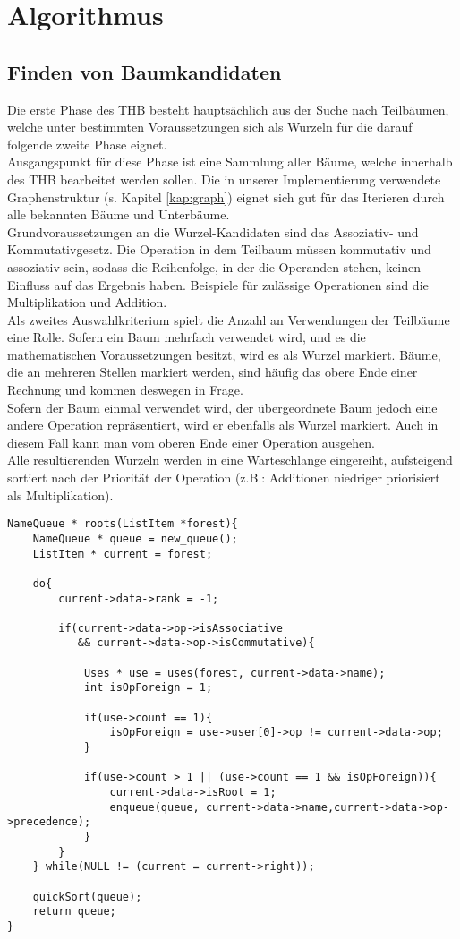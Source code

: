 \chapter{Algorithmus}



\section{Finden von Baumkandidaten}
Die erste Phase des THB besteht hauptsächlich aus der Suche nach Teilbäumen, welche unter bestimmten Voraussetzungen sich als Wurzeln für die darauf folgende zweite Phase eignet.\\
Ausgangspunkt für diese Phase ist eine Sammlung aller Bäume, welche innerhalb des THB bearbeitet werden sollen. Die in unserer Implementierung verwendete Graphenstruktur (s. Kapitel \ref{kap:graph}) eignet sich gut für das Iterieren durch alle bekannten Bäume und Unterbäume.\\
Grundvoraussetzungen an die Wurzel-Kandidaten sind das Assoziativ- und Kommutativgesetz. Die Operation in dem Teilbaum müssen kommutativ und assoziativ sein, sodass die Reihenfolge, in der die Operanden stehen, keinen Einfluss auf das Ergebnis haben. Beispiele für zulässige Operationen sind die Multiplikation und Addition.\\
Als zweites Auswahlkriterium spielt die Anzahl an Verwendungen der Teilbäume eine Rolle. Sofern ein Baum mehrfach verwendet wird, und es die mathematischen Voraussetzungen besitzt, wird es als Wurzel markiert. Bäume, die an mehreren Stellen markiert werden, sind häufig das obere Ende einer Rechnung und kommen deswegen in Frage.\\
Sofern der Baum einmal verwendet wird, der übergeordnete Baum jedoch eine andere Operation repräsentiert, wird er ebenfalls als Wurzel markiert. Auch in diesem Fall kann man vom oberen Ende einer Operation ausgehen.\\
Alle resultierenden Wurzeln werden in eine Warteschlange eingereiht, aufsteigend sortiert nach der Priorität der Operation (z.B.: Additionen niedriger priorisiert als Multiplikation).\\

\begin{lstlisting}[caption=Phase 1: Roots, label=list:roots]
NameQueue * roots(ListItem *forest){
	NameQueue * queue = new_queue();
	ListItem * current = forest;
	
	do{
		current->data->rank = -1;
		
		if(current->data->op->isAssociative 
		   && current->data->op->isCommutative){
			
			Uses * use = uses(forest, current->data->name);
			int isOpForeign = 1;          
			
			if(use->count == 1){
				isOpForeign = use->user[0]->op != current->data->op;
			}
			
			if(use->count > 1 || (use->count == 1 && isOpForeign)){               
				current->data->isRoot = 1;
				enqueue(queue, current->data->name,current->data->op->precedence);
			}
		}
	} while(NULL != (current = current->right));
	
	quickSort(queue);
	return queue;
}
\end{lstlisting}

